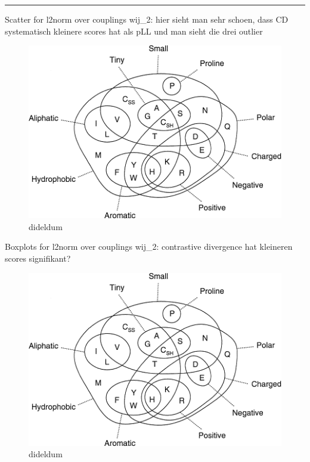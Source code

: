 \documentclass[11pt,a4paper,twoside]{book}
\theoremstyle{definition}
\theoremstyle{definition}
\theoremstyle{remark}
\begin{document}
\begin{center}\rule{0.5\linewidth}{\linethickness}\end{center}

Scatter for l2norm over couplings
\textbar{}\textbar{}wij\textbar{}\textbar{}\_2: hier sieht man sehr
schoen, dass CD systematisch kleinere scores hat als pLL und man sieht
die drei outlier

\begin{figure}

{\centering \includegraphics[width=1\linewidth]{img/aa_venn_diagram} 

}

\caption{dideldum}\label{fig:comparing-cd-pll-scatter2}
\end{figure}

Boxplots for l2norm over couplings
\textbar{}\textbar{}wij\textbar{}\textbar{}\_2: contrastive divergence
hat kleineren scores signifikant?

\begin{figure}

{\centering \includegraphics[width=1\linewidth]{img/aa_venn_diagram} 

}

\caption{dideldum}\label{fig:comapring-cd-pll-boxplot2}
\end{figure}
\end{document}
